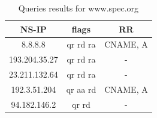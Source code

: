 \documentclass[a4paper,10pt]{article}
\begin{document}
\begin{multicols}{2}
        \begin{table}[H]
                \centering
                \caption{\small Queries results for www.spec.org}
                \vspace{0.3cm}
                \begin{tabular}{|c|c|c|}
                \hline
                \textbf{NS-IP} & \textbf{flags} & \textbf{RR} \\ \hline
                8.8.8.8 & qr rd ra & CNAME, A \\ \hline
                193.204.35.27 & qr rd ra & - \\ \hline
                23.211.132.64 & qr rd ra & - \\ \hline
                192.3.51.204 & \cellcolor{cyan} qr aa rd & CNAME, A \\ \hline
                94.182.146.2 & qr rd & - \\ \hline
                \end{tabular}
                \label{tab:quest_3_spec}
        \end{table}


\end{multicols}
\end{document}
